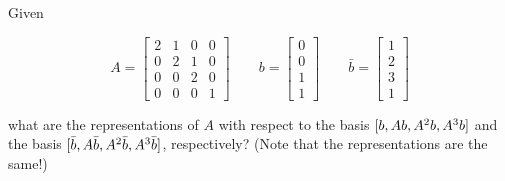 \item [3.12] Given

\begin{equation*}
 A = \begin{bmatrix}
      2 & 1 & 0 & 0 \\
      0 & 2 & 1 & 0 \\
      0 & 0 & 2 & 0 \\
      0 & 0 & 0 & 1
     \end{bmatrix}
\qquad
b = \begin{bmatrix}
     0 \\
     0 \\
     1 \\
     1
    \end{bmatrix}
\qquad
\bar b = \begin{bmatrix}
          1 \\
          2\\
          3\\
          1
         \end{bmatrix}
\end{equation*}

what are the representations of $A$ with respect to the basis $[b, \/ Ab, \/A^2 b,\/ A^3b]$ and the basis $[\bar b, \/ A \bar b, \/A^2 \bar b,\/ A^3 \bar b]$, respectively?
(Note that the representations are the same!)
